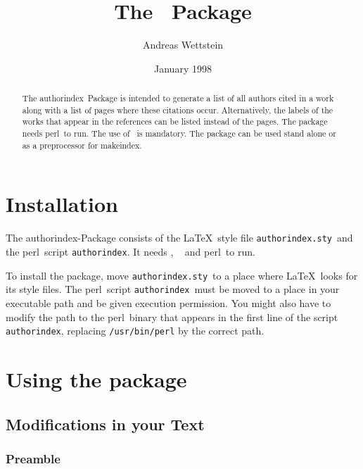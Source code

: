 \documentclass{article}
\title{The \authorindex\ Package}
\author{Andreas Wettstein}
\date{January 1998}
\newcommand{\authorindex}{\textsf{authorindex}}
\newcommand{\mkindex}{\textsf{makeindex}}
\newcommand{\aisty}{\texttt{authorindex.sty}}
\newcommand{\aiperl}{\texttt{authorindex}}
\newcommand{\perl}{\textsf{perl}}
\newcommand{\file}[1]{\texttt{#1}}
\begin{document}
\maketitle

\begin{abstract}
  The \authorindex\ Package is intended to generate a list of all authors cited
  in a work along with a list of pages where these citations occur.
  Alternatively, the labels of the works that appear in the references can be
  listed instead of the pages. The package needs \perl\ to run. The use of
  \BibTeX\ is mandatory. The package can be used stand alone or as a
  preprocessor for \mkindex.
\end{abstract}


\section{Installation}

The \authorindex-Package consists of the \LaTeX\ style file \aisty\ and the
\perl\ script \aiperl. It needs \LaTeXe, \BibTeX\ \cite{Patashnik88a} and
\perl\ to run.

To install the package, move \aisty\ to a place where \LaTeX\ looks for its
style files.  The \perl\ script \aiperl\ must be moved to a place in your
executable path and be given execution permission.  You might also have to
modify the path to the \perl\ binary that appears in the first line of the
script \aiperl, replacing \file{/usr/bin/perl} by the correct path.

\section{Using the package}

\subsection{Modifications in your Text}
\label{sec:ModText}


\subsubsection{Preamble}
\end{document}
